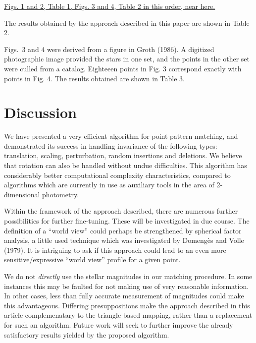 \begin{center}
\bigskip

\underline{Figs. 1 and 2, Table 1, Figs. 3 and 4, Table 2 in this order,
near here.}

\end{center}

\bigskip


The results obtained by the approach described in this paper are shown
in Table 2. 

Figs.\ 3 and 4 were derived from a figure in Groth (1986).  A digitized 
photographic image provided the stars in one set, and the points in the
other set were culled from a catalog.  Eighteeen points in Fig. 3 correspond
exactly with points in Fig. 4. The results obtained are shown in
Table 3.

\section{Discussion}

We have presented a very efficient algorithm for point pattern matching,
and demonstrated its success in handling invariance of the following types:
translation, scaling, perturbation, random insertions and deletions.  We
believe that rotation can also be handled without undue difficulties.
This algorithm has considerably better computational complexity characteristics,
compared to algorithms which are currently in use as auxiliary tools in the
area of 2-dimensional photometry.

Within the framework of the approach described, there are numerous further
possibilities for further fine-tuning.  These will be investigated in due
course.  The definition of a ``world view'' could perhaps be strengthened
by spherical factor analysis, a little used technique which was
investigated by Domeng\`es and Volle (1979).  It is intriguing to ask if this
approach could lead to an even more sensitive/expressive ``world view''
profile for a given point.

We do not {\it directly} use the stellar magnitudes in our matching procedure.
In some instances this may be faulted for not making use of very reasonable
information.  In other cases, less than fully accurate measurement of 
magnitudes could make this advantageous.  Differing presuppositions make the
approach described in this article complemenatary to the triangle-based
mapping, rather than a replacement for such an algorithm.
Future work will seek to further improve the already satisfactory results
yielded by the proposed algorithm.

